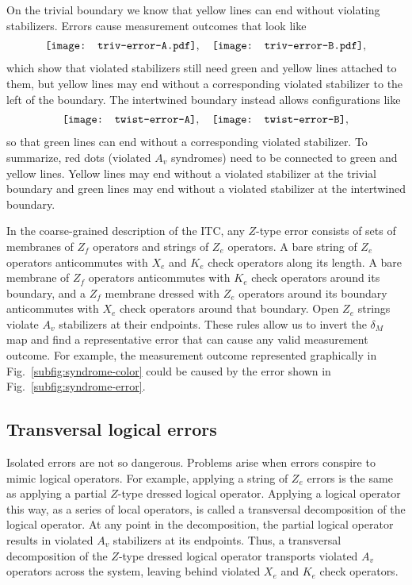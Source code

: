 On the trivial boundary we know that yellow lines can end without violating stabilizers. Errors cause measurement outcomes that look like
\begin{align}
\vcenter{\hbox{\texttt{[image: triv-error-A.pdf]}}}, \quad \vcenter{\hbox{\texttt{[image: triv-error-B.pdf]}}},
\end{align}
which show that violated stabilizers still need green and yellow lines attached to them, but yellow lines may end without a corresponding violated stabilizer to the left of the boundary.
The intertwined boundary instead allows configurations like
\begin{align}
\vcenter{\hbox{\texttt{[image: twist-error-A]}}}, \quad \vcenter{\hbox{\texttt{[image: twist-error-B]}}},
\end{align}
so that green lines can end without a corresponding violated stabilizer.
To summarize, red dots (violated $A_v$ syndromes) need to be connected to green and yellow lines. Yellow lines may end without a violated stabilizer at the trivial boundary and green lines may end without a violated stabilizer at the intertwined boundary. 

In the coarse-grained description of the ITC, any $Z$-type error consists of sets of membranes of $Z_f$ operators and strings of $Z_e$ operators. A bare string of $Z_e$ operators anticommutes with $X_e$ and $K_e$ check operators along its length. A bare membrane of $Z_f$ operators anticommutes with $K_e$ check operators around its boundary, and a $Z_f$ membrane dressed with $Z_e$ operators around its boundary anticommutes with $X_e$ check operators around that boundary. Open $Z_e$ strings violate $A_v$ stabilizers at their endpoints. These rules allow us to invert the $\delta_M$ map and find a representative error that can cause any valid measurement outcome. For example, the measurement outcome represented graphically in Fig.~\ref{subfig:syndrome-color} could be caused by the error shown in Fig.~\ref{subfig:syndrome-error}.

\subsection{Transversal logical errors} \label{sub:transversal}

Isolated errors are not so dangerous. Problems arise when errors conspire to mimic logical operators. For example, applying a string of $Z_e$ errors is the same as applying a partial $Z$-type dressed logical operator. Applying a logical operator this way, as a series of local operators, is called a transversal decomposition of the logical operator. At any point in the decomposition, the partial logical operator results in violated $A_v$ stabilizers at its endpoints. Thus, a transversal decomposition of the $Z$-type dressed logical operator transports violated $A_v$ operators across the system, leaving behind violated $X_e$ and $K_e$ check operators. 

